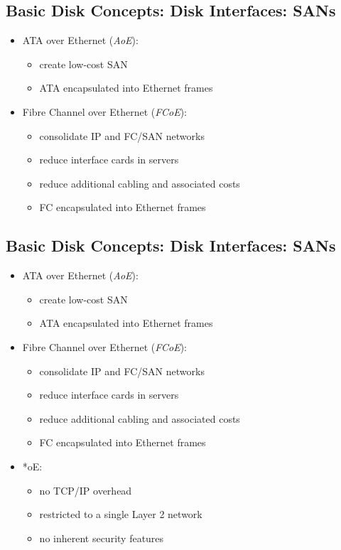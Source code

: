 \documentclass[xga]{xdvislides}
\begin{document}
\subsection{Basic Disk Concepts: Disk Interfaces: SANs}
\begin{itemize}
	\item ATA over Ethernet ({\em AoE}):
		\begin{itemize}
			\item create low-cost SAN
			\item ATA encapsulated into Ethernet frames
		\end{itemize}
	\item Fibre Channel over Ethernet ({\em FCoE}):
		\begin{itemize}
			\item consolidate IP and FC/SAN networks
			\item reduce interface cards in servers
			\item reduce additional cabling and associated costs
			\item FC encapsulated into Ethernet frames
		\end{itemize}
\end{itemize}

\subsection{Basic Disk Concepts: Disk Interfaces: SANs}
\begin{itemize}
	\item ATA over Ethernet ({\em AoE}):
		\begin{itemize}
			\item create low-cost SAN
			\item ATA encapsulated into Ethernet frames
		\end{itemize}
	\item Fibre Channel over Ethernet ({\em FCoE}):
		\begin{itemize}
			\item consolidate IP and FC/SAN networks
			\item reduce interface cards in servers
			\item reduce additional cabling and associated costs
			\item FC encapsulated into Ethernet frames
		\end{itemize}

	\item *oE:
		\begin{itemize}
			\item no TCP/IP overhead
			\item restricted to a single Layer 2 network
			\item no inherent security features
		\end{itemize}
\end{itemize}
\end{document}
